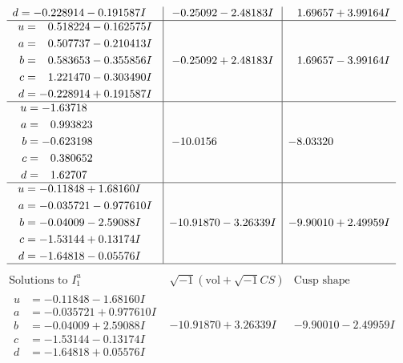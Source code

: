 \documentclass[1p]{elsarticle_modified}
\theoremstyle{definition}
\newcommand{\I}{\sqrt{-1}}
\begin{document}
$$\begin{array}{c|c|c}
\begin{aligned}
d &= -0.228914 - 0.191587 I\end{aligned}
 & -0.25092 - 2.48183 I & \phantom{-}1.69657 + 3.99164 I \\ \hline\begin{aligned}
u &= \phantom{-}0.518224 - 0.162575 I \\
a &= \phantom{-}0.507737 - 0.210413 I \\
b &= \phantom{-}0.583653 - 0.355856 I \\
c &= \phantom{-}1.221470 - 0.303490 I \\
d &= -0.228914 + 0.191587 I\end{aligned}
 & -0.25092 + 2.48183 I & \phantom{-}1.69657 - 3.99164 I \\ \hline\begin{aligned}
u &= -1.63718\phantom{ +0.000000I} \\
a &= \phantom{-}0.993823\phantom{ +0.000000I} \\
b &= -0.623198\phantom{ +0.000000I} \\
c &= \phantom{-}0.380652\phantom{ +0.000000I} \\
d &= \phantom{-}1.62707\phantom{ +0.000000I}\end{aligned}
 & -10.0156\phantom{ +0.000000I} & -8.03320\phantom{ +0.000000I} \\ \hline\begin{aligned}
u &= -0.11848 + 1.68160 I \\
a &= -0.035721 - 0.977610 I \\
b &= -0.04009 - 2.59088 I \\
c &= -1.53144 + 0.13174 I \\
d &= -1.64818 - 0.05576 I\end{aligned}
 & -10.91870 - 3.26339 I & -9.90010 + 2.49959 I\\
 \hline 
 \end{array}$$\newpage$$\begin{array}{c|c|c}  
\text{Solutions to }I^u_{1}& \I (\text{vol} + \sqrt{-1}CS) & \text{Cusp shape}\\
 \hline 
\begin{aligned}
u &= -0.11848 - 1.68160 I \\
a &= -0.035721 + 0.977610 I \\
b &= -0.04009 + 2.59088 I \\
c &= -1.53144 - 0.13174 I \\
d &= -1.64818 + 0.05576 I\end{aligned}
 & -10.91870 + 3.26339 I & -9.90010 - 2.49959 I \\ \hline\begin{aligned}

\end{aligned}
\end{array}$$
\end{document}
